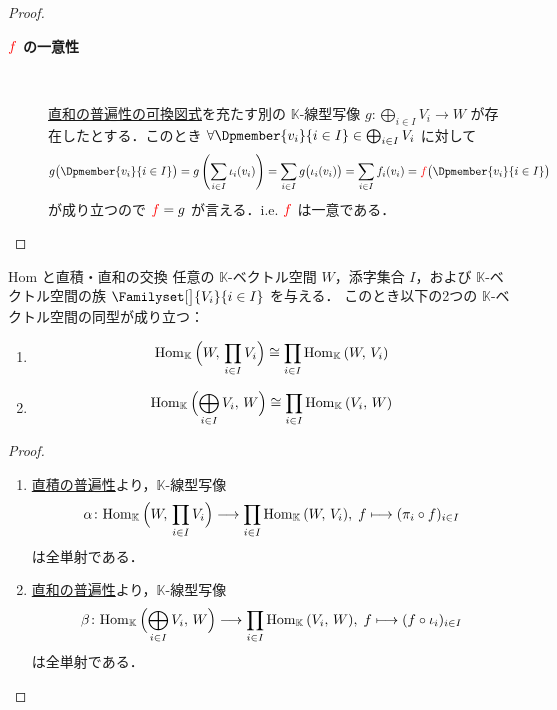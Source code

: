 \documentclass[rep_main]{subfiles}
\begin{document}
\begin{proof}
\begin{enumerate}
\begin{description}
			\item[\textbf{$\textcolor{red}{f}$ の一意性}]　
            
            \hyperref[def:univ-vec-sum]{直和の普遍性の可換図式}を充たす別の $\mathbb{K}$-線型写像 $g \colon \displaystyle \bigoplus_{i \in I}V_i \to W$ が存在したとする．このとき $\forall \Dpmember{v_i}{i \in I} \in \bigoplus_{i \in I} V_i$ に対して
			\begin{align}
				g \bigl( \Dpmember{v_i}{i \in I} \bigr) = g \left(\sum_{i \in I} \iota_i (v_i)\right) = \sum_{i \in I} g \bigl( \iota_i(v_i) \bigr) = \sum_{i \in I} f_i(v_i) = \textcolor{red}{f} \bigl( \Dpmember{v_i}{i \in I} \bigr) 
			\end{align}
			が成り立つので $\textcolor{red}{f} = g$ が言える．i.e. $\textcolor{red}{f}$ は一意である．
		\end{description}
	\end{enumerate}
\end{proof}

\begin{myprop}[label=prop:hom-sum]{Hom と直積・直和の交換}
    任意の $\mathbb{K}$-ベクトル空間 $W$，添字集合 $I$，および $\mathbb{K}$-ベクトル空間の族 $\Familyset[\big]{V_i}{i\in I}$ を与える．
    このとき以下の2つの $\mathbb{K}$-ベクトル空間の同型が成り立つ：
    \begin{enumerate}
        \item 
        \begin{align}
            \mathrm{Hom}_{\mathbb{K}} \mathop{} \Bigl( W,\, \prod_{i \in I} V_i \Bigr) \cong \prod_{i \in I} \mathrm{Hom}_{\mathbb{K}} \mathop{}(W,\, V_i)
        \end{align}
        \item \begin{align}
            \mathrm{Hom}_{\mathbb{K}} \mathop{} \Bigl(\bigoplus_{i \in I} V_i,\, W\Bigr) \cong \prod_{i \in I} \mathrm{Hom}_{\mathbb{K}} \mathop{}(V_i,\, W)
        \end{align}
    \end{enumerate}
    
\end{myprop}

\begin{proof}
    \begin{enumerate}
        \item \hyperref[def:univ-vec-sum]{直積の普遍性}より，$\mathbb{K}$-線型写像
        \begin{align}
            \alpha\colon \mathrm{Hom}_{\mathbb{K}} \mathop{} \Bigl( W,\, \prod_{i \in I} V_i \Bigr) \longrightarrow \prod_{i \in I} \mathrm{Hom}_{\mathbb{K}} \mathop{}(W,\, V_i),\; f \longmapsto (\pi_i \circ f)_{i \in I}
        \end{align}
        は全単射である．
        \item \hyperref[def:univ-vec-sum]{直和の普遍性}より，$\mathbb{K}$-線型写像
        \begin{align}
            \beta \colon \mathrm{Hom}_{\mathbb{K}} \mathop{} \Bigl(\bigoplus_{i \in I} V_i,\, W\Bigr) \longrightarrow \prod_{i \in I} \mathrm{Hom}_{\mathbb{K}} \mathop{}(V_i,\, W),\; f \longmapsto (f \circ \iota_i)_{i \in I}
        \end{align}
        は全単射である．
    \end{enumerate}
\end{proof}
\end{document}
